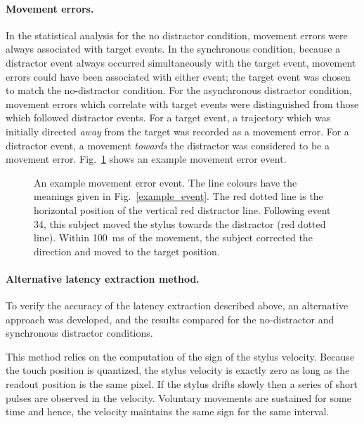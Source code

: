 \documentclass[10pt,letterpaper]{article}
\begin{document}
\paragraph{Movement errors.} In the statistical analysis for the no
distractor condition, movement errors were always associated with
target events. In the synchronous condition, because a distractor
event always occurred simultaneously with the target event, movement
errors could have been associated with either event; the target event
was chosen to match the no-distractor condition. For the
asynchronous distractor condition, movement errors which correlate
with target events were distinguished from those which followed
distractor events. For a target event, a trajectory which was initially
directed \emph{away} from the target was recorded as a movement error. For a
distractor event, a movement \emph{towards} the distractor was considered to
be a movement error. Fig.~\ref{example_errorevent} shows an example movement
error event.

\begin{figure}[htb!]
\centering
\caption[Example error event] {An example movement error event. The
  line colours have the meanings given in
  Fig.~\ref{example_event}. The red dotted line is the horizontal
  position of the vertical red distractor line. Following event 34,
  this subject moved the stylus towards the distractor (red dotted
  line). Within 100~ms of the movement, the subject corrected the
  direction and moved to the target position.}
\label{example_errorevent}
\end{figure}

\paragraph{Alternative latency extraction method.}

To verify the accuracy of the latency extraction described above, an
alternative approach was developed, and the results compared for the
no-distractor and synchronous distractor conditions.

This method relies on the computation of the sign of the stylus
velocity. Because the touch position is quantized, the stylus velocity
is exactly zero as long as the readout position is the same pixel. If
the stylus drifts slowly then a series of short pulses are observed in
the velocity. Voluntary movements are sustained for some time and
hence, the velocity maintains the same sign for the same interval.
\end{document}
